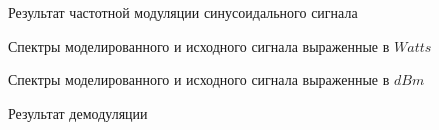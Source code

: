 \documentclass[a4paper,14pt]{extarticle}
\begin{document}
\begin{figure}[H]
\caption{Результат частотной модуляции синусоидального сигнала}
\label{020}
\end{figure}

\begin{figure}[H]
\caption{Спектры моделированного и исходного сигнала выраженные в $Watts$}
\label{300}
\end{figure}

\begin{figure}[H]
\caption{Спектры моделированного и исходного сигнала выраженные в $dBm$}
\label{301}
\end{figure}

\begin{figure}[H]
\caption{Результат демодуляции}
\label{021}
\end{figure}
\end{document}
